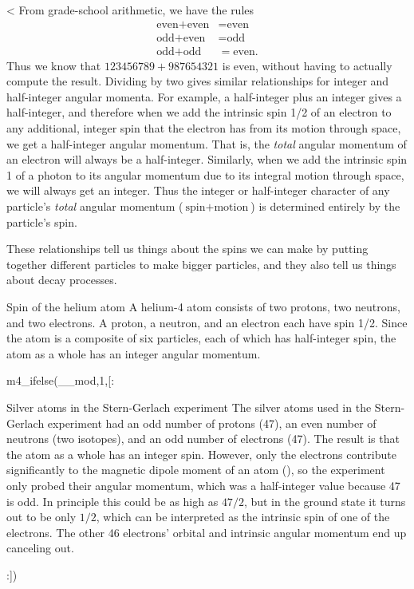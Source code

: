<%
From grade-school arithmetic, we have the rules
\begin{align*}
  \text{even}+\text{even} &= \text{even} \\
  \text{odd}+\text{even} &= \text{odd} \\
  \text{odd}+\text{odd} &= \text{even}.
\end{align*}
Thus we know that $123456789+987654321$ is even, without having to actually compute the result.
Dividing by two gives similar relationships for integer and half-integer angular momenta.
For example, a half-integer plus an integer gives a half-integer, and therefore when we add
the intrinsic spin 1/2 of an electron to any additional, integer spin that the electron
has from its motion through space,
we get a half-integer angular momentum. That is, the \emph{total} angular momentum of an electron
will always be a half-integer. Similarly, when we add the intrinsic spin 1 of a photon to its
angular momentum due to its integral motion through space, we will always get an integer. Thus
the integer or half-integer character of any particle's \emph{total} angular momentum 
($\text{spin}+\text{motion}$) is determined entirely by the particle's spin.

These relationships tell us things about the spins we can make by putting together different
particles to make bigger particles, and they also tell us things about decay processes.

\begin{eg}{Spin of the helium atom}
A helium-4 atom consists of two protons, two neutrons, and two electrons.
A proton, a neutron, and an electron each have spin 1/2. Since the atom is
a composite of six particles, each of which has half-integer spin, the atom as
a whole has an integer angular momentum.
\end{eg}

m4_ifelse(__mod,1,[:\begin{eg}{Silver atoms in the Stern-Gerlach experiment}\label{eg:stern-gerlach-total-spin}
The silver atoms used in the Stern-Gerlach experiment had an odd number of protons (47),
an even number of neutrons (two isotopes), and an odd number of electrons (47).
The result is that the atom as a whole has an integer spin. However,
only the electrons contribute significantly to the magnetic dipole moment of an atom (),
so the experiment only probed their angular momentum, which was a half-integer value because 47 is odd.
In principle this could be as high as $47/2$, but in the ground state it turns out to be only $1/2$, which
can be interpreted as the intrinsic spin of one of the electrons. The other 46 electrons' orbital and
intrinsic angular momentum end up canceling out.
\end{eg}
:])

